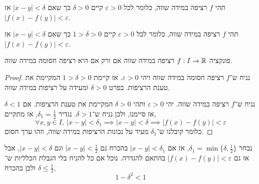 

\usepackage{emoji}



\begin{definition}
	תהי $f$ רציפה במידה שווה, כלומר לכל $\varepsilon > 0$ קיים $\delta > 0$ כך שאם $|x - y| < \delta$ אז $|f(x) - f(y)| < \varepsilon$.
\end{definition}
\begin{definition}
	תהי $f$ רציפה במידה שווה, כלומר לכל $\varepsilon > 0$ קיים $1 > \delta > 0$ כך שאם $|x - y| < \delta$ אז $|f(x) - f(y)| < \varepsilon$.
\end{definition}
\begin{proposition}
	פונקציה $f : I \to \mathbb{R}$ רציפה במידה שווה אם ורק אם היא רציפה חסומה במידה שווה.
\end{proposition}
\begin{proof}
	נניח ש־$f$ רציפה חסומה במידה שווה ויהי $\varepsilon > 0$.
	אז קיימת $1 > \delta > 0$ המקיימת את טענת הרציפות.
	בפרט $\delta > 0$ ומעידה על רציפות במידה שווה.

	נניח ש־$f$ רציפה במידה שווה.
	יהי $\varepsilon > 0$ ותהי $\delta > 0$ המקיימת את טענת הרציפות.
	אם $\delta < 1$ אז סיימנו, ולכן נניח ש־$\delta > 1$.
	נגדיר $\delta_1 = \frac{1}{2}$, אז מתקיים,
	\[
		\forall x, y \in I,\ 
		|x - y| < \delta_1
		\implies |x - y| < \delta
		\implies |f(x) - f(y)| < \varepsilon
	\]
	כלומר קיבלנו ש־$\delta_1$ מעיד על נכונות הרציפות במידה שווה, וזהו ערך חסום.
\end{proof}

\begin{remark}
	נבחר $\delta_1 = \min\{ \delta, \frac{1}{2} \}$, אז אם $|x - y| < \delta_1$ בהכרח גם $|x - y| < \frac{1}{2}$ וגם $|x - y| < \delta$, אבל אז גם $|f(x) - f(y)| < \varepsilon$ בהתאם להגדרה.
	נוכל אם כל להניח בלי הגבלת הכלליות ש־$\delta \le \frac{1}{2}$ ולכן בהכרח,
	\[
		1 - \delta^2
		< 1
	\]
\end{remark}


